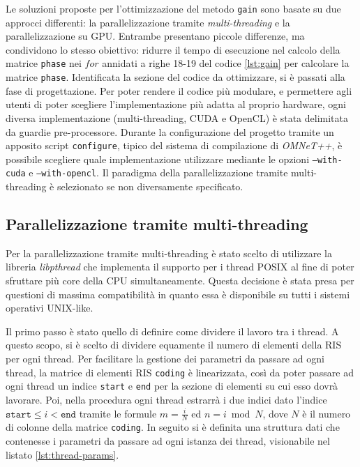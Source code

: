 Le soluzioni proposte per l'ottimizzazione del metodo \texttt{gain} sono basate
su due approcci differenti: la parallelizzazione tramite \textit{multi-threading}
e la parallelizzazione su GPU. Entrambe presentano piccole differenze, ma
condividono lo stesso obiettivo: ridurre il tempo di esecuzione nel calcolo della
matrice \texttt{phase} nei $for$ annidati a righe 18-19 del codice
\ref{lst:gain} per calcolare la matrice \texttt{phase}. Identificata la sezione
del codice da ottimizzare, si è passati alla fase di progettazione. Per poter
rendere il codice più modulare, e permettere agli utenti di poter scegliere l'implementazione
più adatta al proprio hardware, ogni diversa implementazione (multi-threading,
CUDA e OpenCL) è stata delimitata da guardie pre-processore. Durante la
configurazione del progetto tramite un apposito script \texttt{configure},
tipico del sistema di compilazione di \textit{OMNeT++}, è possibile scegliere
quale implementazione utilizzare mediante le opzioni \texttt{--with-cuda} e \texttt{--with-opencl}.
Il paradigma della parallelizzazione tramite multi-threading è selezionato se non
diversamente specificato.

\subsection{Parallelizzazione tramite multi-threading}
\label{subsec:multithreading}

Per la parallelizzazione tramite multi-threading è stato scelto di utilizzare la
libreria \textit{libpthread} che implementa il supporto per i thread POSIX al fine
di poter sfruttare più core della CPU simultaneamente. Questa decisione è stata
presa per questioni di massima compatibilità in quanto essa è disponibile su
tutti i sistemi operativi UNIX-like.

Il primo passo è stato quello di definire come dividere il lavoro tra i thread. A
questo scopo, si è scelto di dividere equamente il numero di elementi della RIS
per ogni thread. Per facilitare la gestione dei parametri da passare ad ogni thread,
la matrice di elementi RIS \texttt{coding} è linearizzata, così da poter passare
ad ogni thread un indice \texttt{start} e \texttt{end} per la sezione di
elementi su cui esso dovrà lavorare. Poi, nella procedura ogni thread estrarrà i
due indici dato l'indice $\texttt{start}\le i < \texttt{end}$ tramite le formule
$m = \frac{i}{N}$ ed $n = i \bmod N$, dove $N$ è il numero di colonne della matrice
\texttt{coding}. In seguito si è definita una struttura dati che contenesse i parametri
da passare ad ogni istanza dei thread, visionabile nel listato
\ref{lst:thread-params}.

